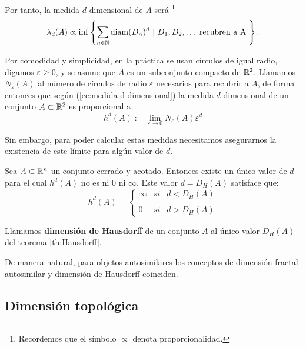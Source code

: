 Por tanto, la medida $d$-dimensional de $A$ será \footnote{Recordemos que el símbolo $\propto$ denota proporcionalidad.}
\begin{equation}\label{ec:medida-d-dimensional}
\lambda_d(A)\propto \inf\left\lbrace \sum_{n\in\mathbb{N}}\mathrm{diam}(D_n)^d \ | \  D_1,D_2,\dots \text{ recubren a A }\right\rbrace.
\end{equation}

Por comodidad y simplicidad, en la práctica se usan círculos de igual radio, digamos $\varepsilon\geq 0$, y se asume que $A$ es un subconjunto compacto de $\mathbb{R}^2$. Llamamos $N_\varepsilon(A)$ al número de círculos de radio $\varepsilon$ necesarios para recubrir a $A$, de forma entonces que según (\ref{ec:medida-d-dimensional}) la medida $d$-dimensional de un conjunto $A\subset\mathbb{R}^2$ es proporcional a
\begin{equation}
h^d(A):= \lim_{\varepsilon\rightarrow 0} N_\varepsilon(A)\varepsilon^d
\end{equation}

Sin embargo, para poder calcular estas medidas necesitamos asegurarnos la existencia de este límite para algún valor de $d$.

\begin{teorema}
\label{th:Hausdorff}
Sea $A\subset \mathbb{R}^n$ un conjunto cerrado y acotado. Entonces existe un único valor de $d$ para el cual $h^d(A)$ no es ni $0$ ni $\infty$. Este valor $d=D_H(A)$ satisface que:
\begin{equation}
h^d(A)= \left\{ \begin{array}{lcc}
             \infty &   si  & d < D_H(A) \\
             \\ 0 &  si & d > D_H(A) 
             \end{array}
   \right.
\end{equation}
\end{teorema} 

\begin{definicion}
Llamamos \textbf{dimensión de Hausdorff} de un conjunto $A$ al único valor $D_H(A)$ del teorema \ref{th:Hausdorff}.
\end{definicion}

De manera natural, para objetos autosimilares los conceptos de dimensión fractal autosimilar y dimensión de Hausdorff coinciden.


\subsection{Dimensión topológica}

